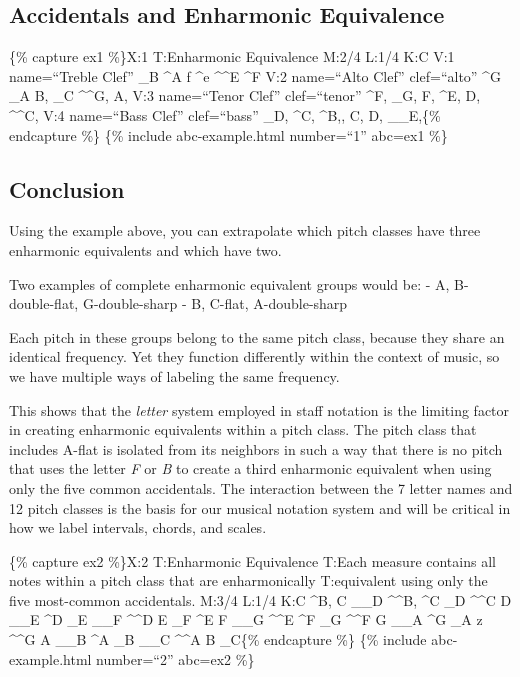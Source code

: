 \documentclass{book}
\begin{document}
\hypertarget{accidentals-and-enharmonic-equivalence}{%
\subsection{Accidentals and Enharmonic
Equivalence}\label{accidentals-and-enharmonic-equivalence}}

\{\% capture ex1 \%\}X:1 T:Enharmonic Equivalence M:2/4 L:1/4 K:C V:1
name=``Treble Clef'' \_B \^{}A \textbar f \^{}e \textbar\^{}\^{}E \^{}F
\textbar{]} V:2 name=``Alto Clef'' clef=``alto'' \^{}G \_A \textbar B, \_C
\textbar\^{}\^{}G, A,\textbar{]} V:3 name=``Tenor Clef'' clef=``tenor'' \^{}F,
\_G, \textbar F, \^{}E, \textbar D, \^{}\^{}C,\textbar{]} V:4 name=``Bass
Clef'' clef=``bass'' \_D, \^{}C, \textbar\^{}B,, C, \textbar D,
\_\_E,\textbar{]}\{\% endcapture \%\} \{\% include abc-example.html
number=``1'' abc=ex1 \%\}

\hypertarget{conclusion-16}{%
\subsection{Conclusion}\label{conclusion-16}}

Using the example above, you can extrapolate which pitch classes have three
enharmonic equivalents and which have two.

Two examples of complete enharmonic equivalent groups would be: - A,
B-double-flat, G-double-sharp - B, C-flat, A-double-sharp

Each pitch in these groups belong to the same pitch class, because they share
an identical frequency. Yet they function differently within the context of
music, so we have multiple ways of labeling the same frequency.

This shows that the \emph{letter} system employed in staff notation is the
limiting factor in creating enharmonic equivalents within a pitch class. The
pitch class that includes A-flat is isolated from its neighbors in such a way
that there is no pitch that uses the letter \emph{F} or \emph{B} to create a
third enharmonic equivalent when using only the five common accidentals. The
interaction between the 7 letter names and 12 pitch classes is the basis for
our musical notation system and will be critical in how we label intervals,
chords, and scales.

\{\% capture ex2 \%\}X:2 T:Enharmonic Equivalence T:Each measure contains all
notes within a pitch class that are enharmonically T:equivalent using only the
five most-common accidentals. M:3/4 L:1/4 K:C \^{}B, C \_\_D\textbar{}
\^{}\^{}B, \^{}C \_D\textbar{} \^{}\^{}C D \_\_E\textbar{} \^{}D \_E
\_\_F\textbar{} \^{}\^{}D E \_F\textbar{} \^{}E F \_\_G\textbar{} \^{}\^{}E
\^{}F \_G\textbar{} \^{}\^{}F G \_\_A\textbar{} \^{}G \_A z\textbar{}
\^{}\^{}G A \_\_B\textbar{} \^{}A \_B \_\_C\textbar{} \^{}\^{}A B
\_C\textbar{]}\{\% endcapture \%\} \{\% include abc-example.html number=``2''
abc=ex2 \%\}
\end{document}
